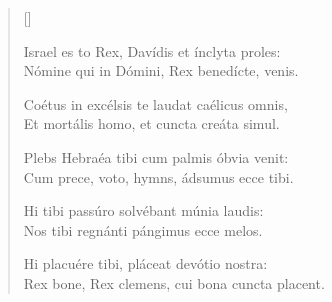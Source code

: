 \newHymn
\JustHymnNum
\settowidth{\versewidth}{own dew, ye heavens, from above, and let
the clou}
{
\gresetfirstlineaboveinitial{}{}
}
\pointtrans
\begin{verse}[\versewidth]

Israel es to Rex, Davídis et ínclyta proles:\\
Nómine qui in Dómini, Rex benedícte, venis.

Coétus in excélsis te laudat caélicus omnis,\\
Et mortális homo, et cuncta creáta simul.

Plebs Hebraéa tibi cum palmis óbvia venit:\\
Cum prece, voto, hymns, ádsumus ecce tibi.

Hi tibi passúro solvébant múnia laudis:\\
Nos tibi regnánti pángimus ecce melos.

Hi placuére tibi, pláceat devótio nostra:\\
Rex bone, Rex clemens, cui bona cuncta placent.

\end{verse}


